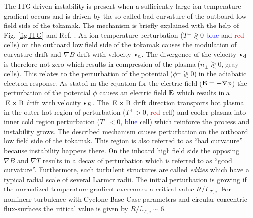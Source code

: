 The ITG-driven instability is present when a sufficiently large ion temperature gradient occurs and is driven by the so-called bad curvature of the outboard low field side of the tokamak. The mechanism is briefly explained with the help of Fig. \ref{fig:ITG} and Ref. . An ion temperature perturbation ($T^\pm \gtrless 0$ \textcolor{blue}{blue} and \textcolor{red}{red} cells) on the outboard low field side of the tokamak causes the modulation of curvature drift and $\nabla B$ drift with velocity $\boldsymbol{\mathbf{v}}_\mathrm{d}$. The divergence of the velocity $\boldsymbol{\mathbf{v}}_\mathrm{d}$ is therefore not zero which results in compression of the plasma ($n_\pm \gtrless 0$, \textcolor{gray}{gray} cells). This relates to the perturbation of the potential ($\phi^\pm  \gtrless 0$) in the adiabatic electron response. As stated in the equation for the electric field ($\boldsymbol{\mathbf{E}} = -\nabla \phi$) the perturbation of the potential $\phi$ causes an electric field $\boldsymbol{\mathbf{E}}$ which results in a $\mathrm{\:E}\times\mathrm{B}$ drift with velocity $\boldsymbol{\mathbf{v}}_E$. The $\mathrm{\:E}\times\mathrm{B}$ drift direction transports hot plasma in the outer hot region of perturbation ($T^+ > 0$, \textcolor{red}{red} cell) and cooler plasma into inner cold region perturbation ($T^- < 0$, \textcolor{blue}{blue} cell) which reinforce the process and instability grows.
\newpage
The described mechanism causes perturbation on the outboard low field side of the tokamak. This region is also referred to as \enquote{bad curvature} because instability happens there. On the inboard high field side the opposing $\nabla B$ and $\nabla T$ results in a decay of perturbation which is referred to as \enquote{good curvature}. Furthermore, such turbulent structures are called \textit{eddies} which have a typical radial scale of several Larmor radii. \cite{Newins2006}
The initial perturbation is growing if the normalized temperature gradient overcomes a critical value $R/L_{T,\mathrm{c}}$. For nonlinear turbulence with Cyclone Base Case parameters and circular concentric flux-surfaces the critical value is given by $R/L_{T,\mathrm{c}} \sim 6$. \cite{Dimits2000, Isliker2010}